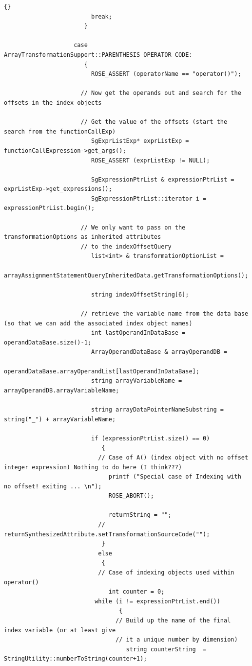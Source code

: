 \documentclass[10pt]{article}
\begin{document}
{\begin{lstlisting}{}
                         break;
                       }

                    case ArrayTransformationSupport::PARENTHESIS_OPERATOR_CODE:
                       {
                         ROSE_ASSERT (operatorName == "operator()");

                      // Now get the operands out and search for the offsets in the index objects

                      // Get the value of the offsets (start the search from the functionCallExp)
                         SgExprListExp* exprListExp = functionCallExpression->get_args();
                         ROSE_ASSERT (exprListExp != NULL);

                         SgExpressionPtrList & expressionPtrList = exprListExp->get_expressions();
                         SgExpressionPtrList::iterator i = expressionPtrList.begin();

                      // We only want to pass on the transformationOptions as inherited attributes
                      // to the indexOffsetQuery
                         list<int> & transformationOptionList =
                              arrayAssignmentStatementQueryInheritedData.getTransformationOptions();

                         string indexOffsetString[6];

                      // retrieve the variable name from the data base (so that we can add the associated index object names)
                         int lastOperandInDataBase = operandDataBase.size()-1;
                         ArrayOperandDataBase & arrayOperandDB =
                              operandDataBase.arrayOperandList[lastOperandInDataBase];
                         string arrayVariableName = arrayOperandDB.arrayVariableName;

                         string arrayDataPointerNameSubstring = string("_") + arrayVariableName;

                         if (expressionPtrList.size() == 0)
                            {
                           // Case of A() (index object with no offset integer expression) Nothing to do here (I think???)
                              printf ("Special case of Indexing with no offset! exiting ... \n");
                              ROSE_ABORT();

                              returnString = "";
                           // returnSynthesizedAttribute.setTransformationSourceCode("");
                            }
                           else
                            {
                           // Case of indexing objects used within operator()
                              int counter = 0;
	                      while (i != expressionPtrList.end()) 
                                 {
                                // Build up the name of the final index variable (or at least give
                                // it a unique number by dimension)
                                   string counterString  = StringUtility::numberToString(counter+1);


\end{lstlisting}}
\end{document}
